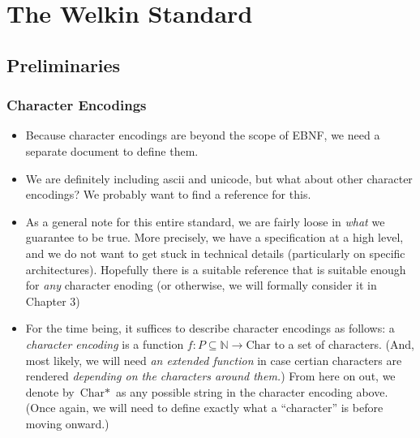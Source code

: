 
\chapter{The Welkin Standard}

\section{Preliminaries}

\subsection{Character Encodings}
\begin{itemize}
  \item Because character encodings are beyond the scope of EBNF, we need a separate document to define them.
  \item We are definitely including ascii and unicode, but what about other character encodings? We probably want to find a reference for this.
	\item As a general note for this entire standard, we are fairly loose in \textit{what} we guarantee to be true. More precisely, we have a specification at a high level, and we do not want to get stuck in technical details (particularly on specific architectures). Hopefully there is a suitable reference that is suitable enough for \textit{any} character enoding (or otherwise, we will formally consider it in Chapter 3)
	\item For the time being, it suffices to describe character encodings as follows: a \textit{character encoding} is a function $f: P \subseteq \mathbb{N} \rightarrow \textrm{Char}$ to a set of characters. (And, most likely, we will need \textit{an extended function} in case certian characters are rendered \textit{depending on the characters around them.}) From here on out, we denote by $\textrm{Char}*$ as any possible string in the character encoding above. (Once again, we will need to define exactly what a ``character'' is before moving onward.)
\end{itemize}

